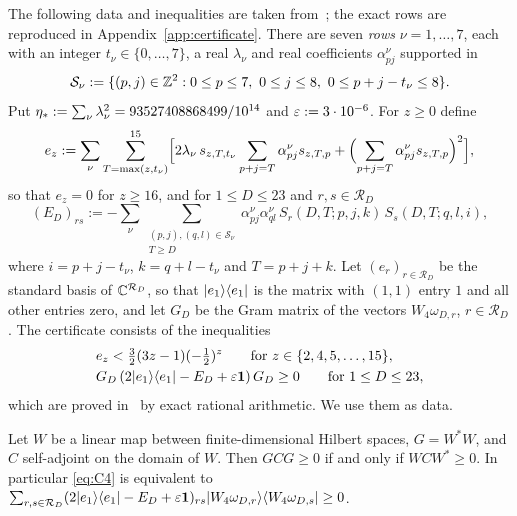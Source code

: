 The following data and inequalities are taken from~\cite[Section~4 and Appendix~A]{OAI:A-Fock-space-inequality-and-the-Laughlin-spectral-gap-September-24-2026};
the exact rows are reproduced in Appendix~\ref{app:certificate}. There are seven \emph{rows} $\nu=1,\dots,7$, each with an
integer $t_\nu\in\{0,\dots,7\}$, a real $\lambda_\nu$ and real coefficients $\alpha^\nu_{pj}$ supported in
\[
\mathcal S_\nu:=\{(p,j)\in\mathbb{Z}^2:0\le p\le7,\ 0\le j\le8,\ 0\le p+j-t_\nu\le8\}.
\]
Put $\eta_{*}:=\sum_\nu\lambda_\nu^2=93527408868499/10^{14}$ and $\varepsilon:=3\cdot10^{-6}$. For $z\ge0$ define
\begin{equation}\label{eq:ez}
e_z:=\sum_\nu\sum_{T=\max(z,t_\nu)}^{15}\Bigl[2\lambda_\nu\,s_{z,T,t_\nu}\sum_{p+j=T}\alpha^\nu_{pj}s_{z,T,p}
+\Bigl(\sum_{p+j=T}\alpha^\nu_{pj}s_{z,T,p}\Bigr)^2\Bigr],
\end{equation}
so that $e_z=0$ for $z\ge16$, and for $1\le D\le23$ and $r,s\in\mathcal R_D$
\begin{equation}\label{eq:ED}
(E_D)_{rs}:=-\sum_\nu\sum_{\substack{(p,j),(q,l)\in\mathcal S_\nu\\ T\ge D}}\alpha^\nu_{pj}\alpha^\nu_{ql}\,S_r(D,T;p,j,k)\,S_s(D,T;q,l,i),
\end{equation}
where $i=p+j-t_\nu$, $k=q+l-t_\nu$ and $T=p+j+k$. Let $(e_r)_{r\in\mathcal R_D}$ be the standard basis of $\mathbb{C}^{\mathcal R_D}$, so
that $\lvert e_1\rangle\langle e_1\rvert$ is the matrix with $(1,1)$ entry $1$ and all other entries zero, and let $G_D$ be the Gram matrix of the
vectors $W_4\omega_{D,r}$, $r\in\mathcal R_D$. The certificate consists of the inequalities
\begin{align}
&e_z<\tfrac32(3z-1)(-\tfrac12)^z\qquad\text{for } z\in\{2,4,5,\dots,15\},\label{eq:C3}\\
&G_D\,(2\lvert e_1\rangle\langle e_1\rvert-E_D+\varepsilon\mathbf{1})\,G_D\ge0\qquad\text{for }1\le D\le23,\label{eq:C4}
\end{align}
which are proved in~\cite[Appendix~A]{OAI:A-Fock-space-inequality-and-the-Laughlin-spectral-gap-September-24-2026} by exact rational
arithmetic. We use them as data.

\begin{lemma}\label{lem:compression}
Let $W$ be a linear map between finite-dimensional Hilbert spaces, $G=W^*W$, and $C$ self-adjoint on the domain of $W$. Then
$GCG\ge0$ if and only if $WCW^*\ge0$. In particular \eqref{eq:C4} is equivalent to
$\sum_{r,s\in\mathcal R_D}(2\lvert e_1\rangle\langle e_1\rvert-E_D+\varepsilon\mathbf{1})_{rs}\lvert W_4\omega_{D,r}\rangle\langle W_4\omega_{D,s}\rvert\ge0$.
\end{lemma}

